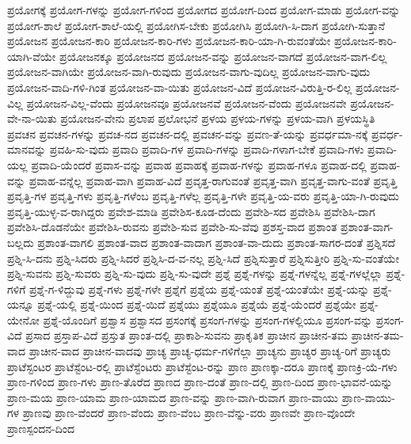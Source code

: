 {ಪ್ರಯೋಗಕ್ಕೆ
ಪ್ರಯೋಗ-ಗಳನ್ನು
ಪ್ರಯೋಗ-ಗಳಿಂದ
ಪ್ರಯೋಗದ
ಪ್ರಯೋಗ-ದಿಂದ
ಪ್ರಯೋಗ-ಮಾಡು
ಪ್ರಯೋಗ-ವನ್ನು
ಪ್ರಯೋಗ-ಶಾಲೆ
ಪ್ರಯೋಗ-ಶಾಲೆ-ಯಲ್ಲಿ
ಪ್ರಯೋಗಿಸ-ಬೇಕು
ಪ್ರಯೋಗಿಸಿ
ಪ್ರಯೋಗಿ-ಸಿ-ದಾಗ
ಪ್ರಯೋಗಿ-ಸುತ್ತಾನೆ
ಪ್ರಯೋಜನ
ಪ್ರಯೋಜನ-ಕಾರಿ
ಪ್ರಯೋಜನ-ಕಾರಿ-ಗಳು
ಪ್ರಯೋಜನ-ಕಾರಿ-ಯಾ-ಗಿ-ರುವಂತೆಯೇ
ಪ್ರಯೋಜನ-ಕಾರಿ-ಯಾಗಿ-ವೆಯೇ
ಪ್ರಯೋಜನಕ್ಕೂ
ಪ್ರಯೋಜನದ
ಪ್ರಯೋಜನ-ವನ್ನು
ಪ್ರಯೋಜನ-ವಾಗದೆ
ಪ್ರಯೋಜನ-ವಾಗ-ಲಿಲ್ಲ
ಪ್ರಯೋಜನ-ವಾಗಿಯೇ
ಪ್ರಯೋಜನ-ವಾಗಿ-ರುವುದು
ಪ್ರಯೋಜನ-ವಾಗು-ವುದಿಲ್ಲ
ಪ್ರಯೋಜನ-ವಾಗು-ವುದು
ಪ್ರಯೋಜನ-ವಾದಿ-ಗಳಿ-ಗಿಂತ
ಪ್ರಯೋಜನ-ವಾ-ಯಿತು
ಪ್ರಯೋಜನ-ವಿದೆ
ಪ್ರಯೋಜನ-ವಿರುತ್ತಿ-ರ-ಲಿಲ್ಲ
ಪ್ರಯೋಜನ-ವಿಲ್ಲ
ಪ್ರಯೋಜನ-ವಿಲ್ಲ-ವೆಂದು
ಪ್ರಯೋಜನವೂ
ಪ್ರಯೋಜನವೆ
ಪ್ರಯೋಜನ-ವೆಂದು
ಪ್ರಯೋಜನವೇ
ಪ್ರಯೋಜನ-ವೇ-ನಾ-ಯಿತು
ಪ್ರಯೋಜನ-ವೇನು
ಪ್ರಲಾಪ
ಪ್ರಲೋಭನೆ
ಪ್ರಳಯ
ಪ್ರಳಯ-ಗಳನ್ನು
ಪ್ರಳಯ-ವಾಗಿ
ಪ್ರಳಯಸ್ಥಿತಿ
ಪ್ರವಚನ
ಪ್ರವಚನ-ಗಳನ್ನು
ಪ್ರವಚ-ನದ
ಪ್ರವಚನ-ದಲ್ಲಿ
ಪ್ರವಚನ-ವನ್ನು
ಪ್ರವಣ-ತೆ-ಯನ್ನು
ಪ್ರವರ್ಧಮಾ-ನಕ್ಕೆ
ಪ್ರವರ್ಧ-ಮಾನವನ್ನು
ಪ್ರವಹಿ-ಸು-ವುದು
ಪ್ರವಾದಿ
ಪ್ರವಾದಿ-ಗಳ
ಪ್ರವಾದಿ-ಗಳನ್ನು
ಪ್ರವಾದಿ-ಗಳಾಗ-ಬೇಕೆ
ಪ್ರವಾದಿ-ಗಳು
ಪ್ರವಾದಿ-ಯಲ್ಲ
ಪ್ರವಾದಿ-ಯೆಂದರೆ
ಪ್ರವಾಸ-ವನ್ನು
ಪ್ರವಾಹ
ಪ್ರವಾಹಕ್ಕೆ
ಪ್ರವಾಹ-ಗಳನ್ನು
ಪ್ರವಾಹ-ಗಳೂ
ಪ್ರವಾಹ-ದಲ್ಲಿ
ಪ್ರವಾಹ-ವನ್ನು
ಪ್ರವಾಹ-ವನ್ನೆಲ್ಲ
ಪ್ರವಾಹ-ವಾಗಿ
ಪ್ರವಾಹ-ವಿದೆ
ಪ್ರವೃತ್ತ-ರಾಗುವಂತೆ
ಪ್ರವೃತ್ತ-ವಾಗಿ
ಪ್ರವೃತ್ತ-ವಾಗು-ವಂತೆ
ಪ್ರವೃತ್ತಿ
ಪ್ರವೃತ್ತಿ-ಗಳ
ಪ್ರವೃತ್ತಿ-ಗಳು
ಪ್ರವೃತ್ತಿ-ಗಳೆಂಬ
ಪ್ರವೃತ್ತಿ-ಗಳೆಲ್ಲ
ಪ್ರವೃತ್ತಿ-ಗಳೇ
ಪ್ರವೃತ್ತಿ-ಯ-ವರು
ಪ್ರವೃತ್ತಿ-ಯಾ-ಗಿ-ರುವುದು
ಪ್ರವೃತ್ತಿ-ಯುಳ್ಳ-ವ-ರಾಗಿದ್ದರು
ಪ್ರವೇಶ-ಮಾಡಿ
ಪ್ರವೇಶಿಸ-ಕೂಡ-ದೆಂದು
ಪ್ರವೇಶಿ-ಸದ
ಪ್ರವೇಶಿಸಿ
ಪ್ರವೇಶಿಸಿ-ದಾಗ
ಪ್ರವೇಶಿಸಿ-ದೊಡನೆಯೇ
ಪ್ರವೇಶಿಸಿ-ರುವನು
ಪ್ರವೇಶಿ-ಸುವ
ಪ್ರವೇಶಿ-ಸು-ವೆವು
ಪ್ರಶಸ್ತ-ವಾದ
ಪ್ರಶಾಂತ
ಪ್ರಶಾಂತ-ವಾಗ-ಬಲ್ಲದು
ಪ್ರಶಾಂತ-ವಾಗಲಿ
ಪ್ರಶಾಂತ-ವಾದ
ಪ್ರಶಾಂತ-ವಾದಾಗ
ಪ್ರಶಾಂತ-ವಾ-ದುದು
ಪ್ರಶಾಂತ-ಸಾಗರ-ದಂತೆ
ಪ್ರಶ್ನಿಸದೆ
ಪ್ರಶ್ನಿ-ಸಿ-ದನು
ಪ್ರಶ್ನಿ-ಸಿದರು
ಪ್ರಶ್ನಿ-ಸಿದರೆ
ಪ್ರಶ್ನಿಸಿ-ದ-ವ-ನಲ್ಲ
ಪ್ರಶ್ನಿ-ಸಿದೆ
ಪ್ರಶ್ನಿಸುತ್ತಾರೆ
ಪ್ರಶ್ನಿಸುತ್ತೀರಿ
ಪ್ರಶ್ನಿ-ಸು-ವಂತೆಯೇ
ಪ್ರಶ್ನಿ-ಸುವನು
ಪ್ರಶ್ನಿ-ಸುವರು
ಪ್ರಶ್ನಿ-ಸು-ವುದು
ಪ್ರಶ್ನಿ-ಸು-ವುದೇ
ಪ್ರಶ್ನೆ
ಪ್ರಶ್ನೆ-ಗಳನ್ನು
ಪ್ರಶ್ನೆ-ಗಳನ್ನೆಲ್ಲ
ಪ್ರಶ್ನೆ-ಗಳಲ್ಲೆಲ್ಲಾ
ಪ್ರಶ್ನೆ-ಗಳಿಗೆ
ಪ್ರಶ್ನೆ-ಗ-ಳಿದ್ದುವು
ಪ್ರಶ್ನೆ-ಗಳು
ಪ್ರಶ್ನೆ-ಗಳೇ
ಪ್ರಶ್ನೆಗೆ
ಪ್ರಶ್ನೆಯ
ಪ್ರಶ್ನೆ-ಯಂತೆ
ಪ್ರಶ್ನೆ-ಯಂತೆಯೇ
ಪ್ರಶ್ನೆ-ಯನ್ನು
ಪ್ರಶ್ನೆ-ಯನ್ನೂ
ಪ್ರಶ್ನೆ-ಯಲ್ಲಿ
ಪ್ರಶ್ನೆ-ಯಿಂದ
ಪ್ರಶ್ನೆ-ಯಿದೆ
ಪ್ರಶ್ನೆಯು
ಪ್ರಶ್ನೆಯೂ
ಪ್ರಶ್ನೆಯೆ
ಪ್ರಶ್ನೆ-ಯೆಂದರೆ
ಪ್ರಶ್ನೆಯೇ
ಪ್ರಶ್ನೆ-ಯೇನೋ
ಪ್ರಶ್ನೆ-ಯೊಂದಿಗೆ
ಪ್ರಶ್ವಾಸ
ಪ್ರಶ್ವಾಸದ
ಪ್ರಸಂಗಕ್ಕೆ
ಪ್ರಸಂಗ-ಗಳನ್ನು
ಪ್ರಸಂಗ-ಗಳಲ್ಲಿಯೂ
ಪ್ರಸಂಗ-ವನ್ನು
ಪ್ರಸಂಗ-ವಿದೆ
ಪ್ರಸಾದ
ಪ್ರಸ್ತಾಪ-ವಿದೆ
ಪ್ರಸ್ತುತ
ಪ್ರಾಂತ-ದಲ್ಲಿ
ಪ್ರಾಕಾಶಿ-ಸುವನು
ಪ್ರಾಕೃತಿಕ
ಪ್ರಾಚೀನ
ಪ್ರಾಚೀನ-ತಮ
ಪ್ರಾಚೀನ-ತಮ-ವಾದ
ಪ್ರಾಚೀನ-ವಾದ
ಪ್ರಾಚೀನ-ವಾದವು
ಪ್ರಾಚ್ಯ
ಪ್ರಾಚ್ಯ-ಧರ್ಮ-ಗಳಿಗೆಲ್ಲಾ
ಪ್ರಾಚ್ಯನು
ಪ್ರಾಚ್ಯರ
ಪ್ರಾಚ್ಯ-ರಿಗೆ
ಪ್ರಾಚ್ಯರು
ಪ್ರಾಟೆಸ್ಟಂಟರ
ಪ್ರಾಟೆಸ್ಟೆಂಟ-ರಲ್ಲಿ
ಪ್ರಾಟೆಸ್ಟೆಂಟರು
ಪ್ರಾಟೆಸ್ಟೆಂಟ-ರನ್ನು
ಪ್ರಾಣ
ಪ್ರಾಣಕ್ಕಾ-ದರೂ
ಪ್ರಾಣಕ್ಕೆ
ಪ್ರಾಣಕ್ರಿ-ಯೆ-ಗಳು
ಪ್ರಾಣ-ಗಳಿಂದ
ಪ್ರಾಣ-ಗಳು
ಪ್ರಾಣ-ತೊರೆದ
ಪ್ರಾಣದ
ಪ್ರಾಣ-ದಂತೆ
ಪ್ರಾಣ-ದಲ್ಲಿ
ಪ್ರಾಣ-ದಿಂದ
ಪ್ರಾಣ-ಭಾವನೆ-ಯನ್ನು
ಪ್ರಾಣ-ಮಯ
ಪ್ರಾಣ-ಯಾಮ
ಪ್ರಾಣ-ಯಾಮದ
ಪ್ರಾಣ-ವನ್ನು
ಪ್ರಾಣ-ವಾಗಿ-ರುವಾಗ
ಪ್ರಾಣ-ವಾಯು
ಪ್ರಾಣ-ವಾಯು-ಗಳ
ಪ್ರಾಣವು
ಪ್ರಾಣ-ವೆಂದರೆ
ಪ್ರಾಣ-ವೆಂದು
ಪ್ರಾಣ-ವೆಂಬ
ಪ್ರಾಣ-ವೆನ್ನು-ವರು
ಪ್ರಾಣವೇ
ಪ್ರಾಣ-ವೊಂದೇ
ಪ್ರಾಣಸ್ಪಂದನ-ದಿಂದ
}
